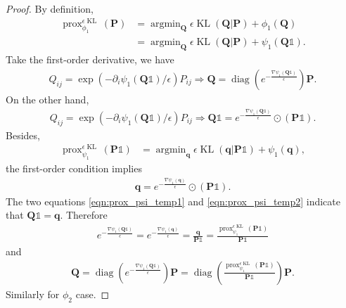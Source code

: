 \documentclass[11pt]{book}
\begin{document}
\begin{proof}
    By definition,
    \begin{align*}
        \operatorname{prox}_{\phi_1}^{\epsilon\operatorname{KL}}(\mathbf{P}) &= \operatorname{argmin}_{\mathbf{Q}} \epsilon\operatorname{KL}(\mathbf{Q}|\mathbf{P}) + \phi_1(\mathbf{Q}) \\
        &= \operatorname{argmin}_{\mathbf{Q}} \epsilon\operatorname{KL}(\mathbf{Q}|\mathbf{P}) + \psi_1(\mathbf{Q}\mathbb{1}).
    \end{align*}
    Take the first-order derivative, we have
    \begin{align*}
        Q_{ij} = \exp(-\partial_i\psi_1(\mathbf{Q}\mathbb{1})/\epsilon)P_{ij} \Rightarrow \mathbf{Q} = \operatorname{diag}\left( e^{-\frac{\nabla\psi_1(\mathbf{Q}\mathbb{1})}{\epsilon}} \right) \mathbf{P}.
    \end{align*}
    On the other hand,
    \begin{align}\label{eqn:prox_psi_temp1}
        Q_{ij} = \exp(-\partial_i\psi_1(\mathbf{Q}\mathbb{1})/\epsilon)P_{ij} \Rightarrow
        \mathbf{Q}\mathbb{1} = e^{-\frac{\nabla\psi_1(\mathbf{Q}\mathbb{1})}{\epsilon}}\odot (\mathbf{P}\mathbb{1}).
    \end{align}
    Besides, 
    \begin{align*}
        \operatorname{prox}_{\psi_1}^{\epsilon\operatorname{KL}}(\mathbf{P}\mathbb{1}) &= \operatorname{argmin}_{\mathbf{q}} \epsilon\operatorname{KL}(\mathbf{q}|\mathbf{P}\mathbb{1}) + \psi_1(\mathbf{q}),
    \end{align*}
    the first-order condition implies
    \begin{align}\label{eqn:prox_psi_temp2}
        \mathbf{q} = e^{-\frac{\nabla\psi_1(\mathbf{q})}{\epsilon}}\odot (\mathbf{P}\mathbb{1}).
    \end{align}
    The two equations \eqref{eqn:prox_psi_temp1} and \eqref{eqn:prox_psi_temp2} indicate that $\mathbf{Q}\mathbb{1} = \mathbf{q}$.
    Therefore
    \begin{align*}
        e^{-\frac{\nabla\psi_1(\mathbf{Q}\mathbb{1})}{\epsilon}} = e^{-\frac{\nabla\psi_1(\mathbf{q})}{\epsilon}}=\frac{\mathbf{q}}{\mathbf{P}\mathbb{1}} = \frac{\operatorname{prox}_{\psi_1}^{\epsilon\operatorname{KL}}(\mathbf{P}\mathbb{1})}{\mathbf{P}\mathbb{1}} 
    \end{align*}
    and 
    \begin{align*}
        \mathbf{Q} = \operatorname{diag}\left( e^{-\frac{\nabla\psi_1(\mathbf{Q}\mathbb{1})}{\epsilon}} \right) \mathbf{P} = \operatorname{diag}\left( \frac{\operatorname{prox}_{\psi_1}^{\epsilon\operatorname{KL}}(\mathbf{P}\mathbb{1})}{\mathbf{P}\mathbb{1}}  \right) \mathbf{P}.
    \end{align*}
    Similarly for $\phi_2$ case.
\end{proof}
\end{document}

